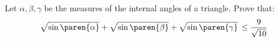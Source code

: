 Let $\alpha, \beta, \gamma$ be the measures of the internal angles of a triangle.
Prove that:
\begin{equation*}
  \sqrt{\sin\paren{\alpha}}
  + \sqrt{\sin\paren{\beta}}
  + \sqrt{\sin\paren{\gamma}}
  \, \leq
  \frac{9}{\sqrt{10}}
\end{equation*}
